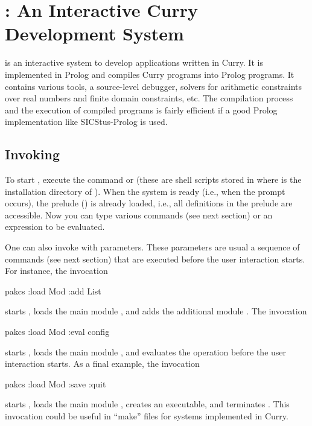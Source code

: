 \section{\CYS: An Interactive Curry Development System}
\label{sec-curry2prolog}

\CYS\index{\CYS} is an interactive system to develop applications
written in Curry.
It is implemented in Prolog and compiles
Curry programs into Prolog programs. It contains various tools,
a source-level debugger,
solvers for arithmetic constraints over real numbers
and finite domain constraints, etc. The compilation process and the
execution of compiled programs is fairly efficient
if a good Prolog implementation like SICStus-Prolog is used.


\subsection{Invoking \CYS}
\label{sec:invoke-kics2}

To start \CYS, execute the command
 or 
(these are shell scripts stored in
 where \cyshome is the installation directory
of \CYS).
When the system is ready (i.e., when the prompt  occurs),
the prelude ()
is already loaded, i.e., all definitions in the prelude are accessible.
Now you can type various commands (see next section)
or an expression to be evaluated.

One can also invoke \CYS with parameters.
These parameters are usual a sequence of commands
(see next section) that are executed before the user interaction
starts. For instance, the invocation
\begin{curry}
pakcs :load Mod :add List
\end{curry}
starts \CYS, loads the main module , and adds the additional
module .
The invocation
\begin{curry}
pakcs :load Mod :eval config
\end{curry}
starts \CYS, loads the main module , and evaluates
the operation  before the user interaction starts.
As a final example, the invocation
\begin{curry}
pakcs :load Mod :save :quit
\end{curry}
starts \CYS, loads the main module , creates an executable,
and terminates \CYS. This invocation could be useful in ``make'' files
for systems implemented in Curry.

